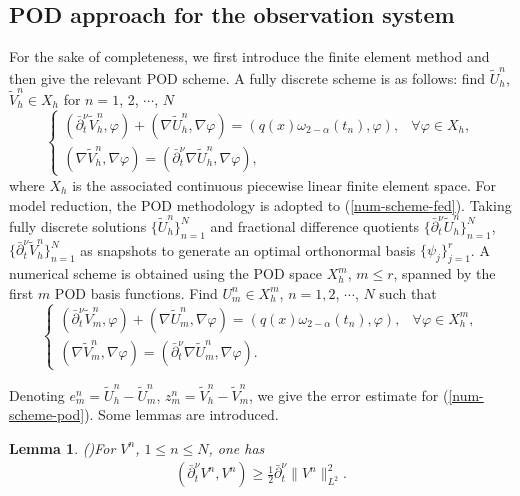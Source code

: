 \documentclass[11pt]{article}
\newtheorem{lemma}{Lemma}[section]
\numberwithin{equation}{section}
\begin{document}
\subsection{POD approach for the observation system}
For the sake of completeness, we first introduce the finite element method and then give the relevant POD scheme.
A fully discrete scheme is as follows: find $\widetilde{U}_h^n$, $\widetilde{V}_h^n\in X_h$ for $n=1$, 2, $\cdots$, $N$
\begin{equation}\label{num-scheme-fed}
\begin{cases}
  (\bar\partial_t^\nu \widetilde{V}_h^n,\varphi) + (\nabla \widetilde{U}_h^n,\nabla \varphi) = (q(x)\omega_{2-\alpha}(t_n),\varphi), & \forall \varphi\in X_h, \\
  (\nabla\widetilde{V}_h^n,\nabla\varphi)  = (\bar\partial_t^\nu \nabla\widetilde{U}_h^n,\nabla\varphi),
\end{cases}
\end{equation}
where $X_h$ is the associated continuous piecewise linear finite element space. 
For model reduction, the POD methodology is adopted to (\ref{num-scheme-fed}). Taking fully discrete solutions $\{\widetilde{U}_h^n\}_{n=1}^N$ and fractional difference quotients $\{\bar\partial_t^\nu \widetilde{U}_h^n\}_{n=1}^N$, $\{\bar\partial_t^\nu \widetilde{V}_h^n\}_{n=1}^N$ as snapshots to generate an optimal orthonormal basis $\{\psi_j\}_{j=1}^r$. A numerical scheme is obtained using the POD space $X_h^m$, $m\le r$, spanned by the first $m$ POD basis functions. Find $U_m^n\in X_h^m$, $n=1,2$, $\cdots$, $N$ such that
\begin{equation}\label{num-scheme-pod}
\begin{cases}
  (\bar\partial_t^\nu \widetilde{V}_m^n,\varphi) + (\nabla \widetilde{U}_m^n,\nabla \varphi) = (q(x)\omega_{2-\alpha}(t_n),\varphi), & \forall \varphi\in X_h^m, \\
  (\nabla\widetilde{V}_m^n,\nabla\varphi)  = (\bar\partial_t^\nu \nabla\widetilde{U}_m^n,\nabla\varphi).
\end{cases}
\end{equation}

Denoting $e_m^n=\widetilde{U}_h^n-\widetilde{U}_m^n$, $z_m^n=\widetilde{V}_h^n-\widetilde{V}_m^n$, we give the error estimate for (\ref{num-scheme-pod}). Some lemmas are introduced.

\begin{lemma}\label{FD-ineq}
(\cite{LiaoH2018L1})For $V^n$, $1\leq n\leq N$, one has
\begin{align*}
(\bar\partial_t^\nu V^n,V^n)\geq \frac{1}{2}\bar\partial_t^\nu \|V^n\|_{L^2}^2.    
\end{align*}
\end{lemma}
\end{document}
